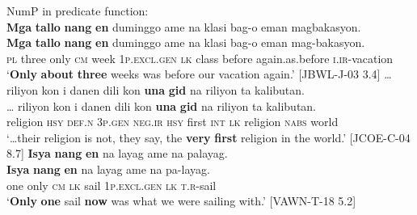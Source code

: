 \ea
NumP in predicate function: \\
\textbf{Mga}  \textbf{tallo}  \textbf{nang}  \textbf{en}   duminggo  ame  na  klasi bag-o  eman  magbakasyon. \\\smallskip
 \gll \textbf{Mga}  \textbf{tallo}  \textbf{nang}  \textbf{en}   duminggo\textup{\footnotemark{}}  ame  na  klasi bag-o  eman  mag-bakasyon. \\
\textsc{pl}  three  only  \textsc{cm}  week  1\textsc{p.excl.gen}  \textsc{lk}  class
before  again.as.before  \textsc{i.ir}-vacation \\
\glt `\textbf{Only} \textbf{about} \textbf{three} weeks was before our vacation again.’ [JBWL-J-03 3.4]
\z
\ea
… riliyon  kon  i  danen  dili  kon \textbf{una}  \textbf{gid}   na  riliyon  ta  kalibutan. \\\smallskip
 \gll … riliyon  kon  i  danen  dili  kon \textbf{una}  \textbf{gid}   na  riliyon  ta  kalibutan. \\
{} religion  \textsc{hsy}  \textsc{def.n} 3\textsc{p.gen}  \textsc{neg.ir}  \textsc{hsy}
first  \textsc{int}  \textsc{lk}  religion  \textsc{nabs}  world \\
\glt ‘…their religion is not, they say, the \textbf{very} \textbf{first} religion in the world.’ [JCOE-C-04 8.7]
\z
\ea
\label{bkm:Ref343776670}
\textbf{Isya}  \textbf{nang}  \textbf{en}   na  layag  ame  na  palayag. \\\smallskip
 \gll \textbf{Isya}  \textbf{nang}  \textbf{en}   na  layag  ame  na  pa-layag. \\
one  only  \textsc{cm}  \textsc{lk}  sail  1\textsc{p.excl.gen}  \textsc{lk}  \textsc{t.r}-sail \\
\glt ‘\textbf{Only} \textbf{one} sail \textbf{now} was what we were sailing with.’ [VAWN-T-18 5.2]
\z

